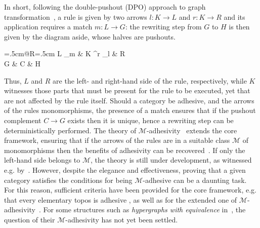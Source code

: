\documentclass[a4paper,UKenglish,cleveref,pdftex,thm-restate,numberwithinsect]{lipics-v2021}
\begin{document}
\vspace{.1cm}
\noindent
\begin{minipage}[l]{.78\linewidth}In short, following the double-pushout (DPO) approach
to graph transformation~\cite{CorradiniMREHL97,ehrig2006fundamentals}, 
a rule is given by two arrows $l: K \to L$ and $r: K \rightarrow R$
and its application requires a match $m: L \to G$: the rewriting step from $G$
to $H$ is then given by the diagram aside, whose halves are pushouts.
  \end{minipage}%
    \hfill
  \begin{minipage}[r]{.20\linewidth }
    \xymatrix@C=.5cm@R=.5cm{
      L \ar[d]_{m}
      & K \ar[r]^r \ar[l]_{l} \ar[d] & R \ar [d] \\
      G & C \ar[r] \ar[l]                    & H
    }
  \end{minipage}
\vspace{.1cm}

\noindent
Thus, $L$ and $R$ are the left- and right-hand side of the rule, respectively, while $K$ witnesses those parts that must 
be present for the rule to be executed, yet that are not affected by the rule itself.
%
Should a category be adhesive, and the arrows of the rules monomorphisms, the presence of a match ensures that
if the pushout complement $C \to G$ exists then it is unique, hence a rewriting step can be deterministically performed.
%
The theory of $\mathcal{M}$-adhesivity~\cite{azzi2019essence,heindel2009category} extends the core framework, ensuring that if the arrows 
of the rules are in a suitable class $\mathcal{M}$ of monomorphisms
then the benefits of adhesivity
can be recovered~\cite{ehrig2012,ehrig2014adhesive}. 
If only the left-hand side belongs to $\mathcal{M}$, the theory is still under development, as witnessed e.g.
by~\cite{BaldanC0G24}.
%
However, despite the elegance and effectiveness,
proving that a given category satisfies the conditions 
for being $\mathcal{M}$-adhesive can be a daunting task. For this reason, sufficient criteria have been provided for the core 
framework, e.g. that every elementary topos is adhesive \cite{lack2006toposes}, as well as for the extended one of
$\mathcal{M}$-adhesivity~\cite{CastelnovoGM24}.
%
For some structures such as \emph{hypergraphs with equivalence} in~\cite{concur2006}, the question 
of their $\mathcal{M}$-adhesivity has not yet been settled.
\end{document}
